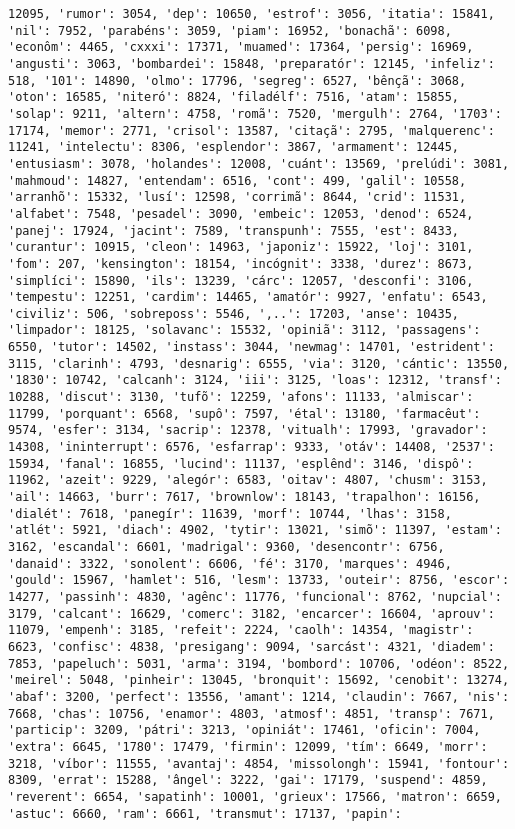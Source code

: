 \begin{Verbatim}[commandchars=\\\{\}]
12095, 'rumor': 3054, 'dep': 10650, 'estrof': 3056, 'itatia': 15841, 'nil': 7952, 'parabéns': 3059, 'piam': 16952, 'bonachã': 6098, 'econôm': 4465, 'cxxxi': 17371, 'muamed': 17364, 'persig': 16969, 'angusti': 3063, 'bombardei': 15848, 'preparatór': 12145, 'infeliz': 518, '101': 14890, 'olmo': 17796, 'segreg': 6527, 'bênçã': 3068, 'oton': 16585, 'niteró': 8824, 'filadélf': 7516, 'atam': 15855, 'solap': 9211, 'altern': 4758, 'romã': 7520, 'mergulh': 2764, '1703': 17174, 'memor': 2771, 'crisol': 13587, 'citaçã': 2795, 'malquerenc': 11241, 'intelectu': 8306, 'esplendor': 3867, 'armament': 12445, 'entusiasm': 3078, 'holandes': 12008, 'cuánt': 13569, 'prelúdi': 3081, 'mahmoud': 14827, 'entendam': 6516, 'cont': 499, 'galil': 10558, 'arranhõ': 15332, 'lusí': 12598, 'corrimã': 8644, 'crid': 11531, 'alfabet': 7548, 'pesadel': 3090, 'embeic': 12053, 'denod': 6524, 'panej': 17924, 'jacint': 7589, 'transpunh': 7555, 'est': 8433, 'curantur': 10915, 'cleon': 14963, 'japoniz': 15922, 'loj': 3101, 'fom': 207, 'kensington': 18154, 'incógnit': 3338, 'durez': 8673, 'simplíci': 15890, 'ils': 13239, 'cárc': 12057, 'desconfi': 3106, 'tempestu': 12251, 'cardim': 14465, 'amatór': 9927, 'enfatu': 6543, 'civiliz': 506, 'sobreposs': 5546, ',..': 17203, 'anse': 10435, 'limpador': 18125, 'solavanc': 15532, 'opiniã': 3112, 'passagens': 6550, 'tutor': 14502, 'instass': 3044, 'newmag': 14701, 'estrident': 3115, 'clarinh': 4793, 'desnarig': 6555, 'via': 3120, 'cántic': 13550, '1830': 10742, 'calcanh': 3124, 'iii': 3125, 'loas': 12312, 'transf': 10288, 'discut': 3130, 'tufõ': 12259, 'afons': 11133, 'almiscar': 11799, 'porquant': 6568, 'supô': 7597, 'étal': 13180, 'farmacêut': 9574, 'esfer': 3134, 'sacrip': 12378, 'vitualh': 17993, 'gravador': 14308, 'ininterrupt': 6576, 'esfarrap': 9333, 'otáv': 14408, '2537': 15934, 'fanal': 16855, 'lucind': 11137, 'esplênd': 3146, 'dispô': 11962, 'azeit': 9229, 'alegór': 6583, 'oitav': 4807, 'chusm': 3153, 'ail': 14663, 'burr': 7617, 'brownlow': 18143, 'trapalhon': 16156, 'dialét': 7618, 'panegír': 11639, 'morf': 10744, 'lhas': 3158, 'atlét': 5921, 'diach': 4902, 'tytir': 13021, 'simõ': 11397, 'estam': 3162, 'escandal': 6601, 'madrigal': 9360, 'desencontr': 6756, 'danaid': 3322, 'sonolent': 6606, 'fé': 3170, 'marques': 4946, 'gould': 15967, 'hamlet': 516, 'lesm': 13733, 'outeir': 8756, 'escor': 14277, 'passinh': 4830, 'agênc': 11776, 'funcional': 8762, 'nupcial': 3179, 'calcant': 16629, 'comerc': 3182, 'encarcer': 16604, 'aprouv': 11079, 'empenh': 3185, 'refeit': 2224, 'caolh': 14354, 'magistr': 6623, 'confisc': 4838, 'presigang': 9094, 'sarcást': 4321, 'diadem': 7853, 'papeluch': 5031, 'arma': 3194, 'bombord': 10706, 'odéon': 8522, 'meirel': 5048, 'pinheir': 13045, 'bronquit': 15692, 'cenobit': 13274, 'abaf': 3200, 'perfect': 13556, 'amant': 1214, 'claudin': 7667, 'nis': 7668, 'chas': 10756, 'enamor': 4803, 'atmosf': 4851, 'transp': 7671, 'particip': 3209, 'pátri': 3213, 'opiniát': 17461, 'oficin': 7004, 'extra': 6645, '1780': 17479, 'firmin': 12099, 'tím': 6649, 'morr': 3218, 'víbor': 11555, 'avantaj': 4854, 'missolongh': 15941, 'fontour': 8309, 'errat': 15288, 'ângel': 3222, 'gai': 17179, 'suspend': 4859, 'reverent': 6654, 'sapatinh': 10001, 'grieux': 17566, 'matron': 6659, 'astuc': 6660, 'ram': 6661, 'transmut': 17137, 'papin': 
\end{Verbatim}
